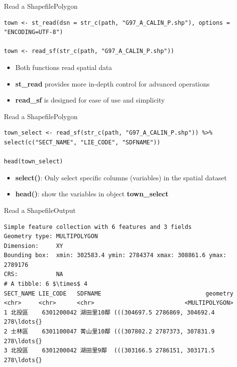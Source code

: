 \documentclass[hyperref={pdfpagelabels=false}]{beamer}
\begin{document}
\begin{frame}[fragile]{Read a Shapefile}{Polygon}

\begin{lstlisting}
town <- st_read(dsn = str_c(path, "G97_A_CALIN_P.shp"), options = "ENCODING=UTF-8")

town <- read_sf(str_c(path, "G97_A_CALIN_P.shp"))
\end{lstlisting}
\begin{itemize}
\item Both functions read spatial data
\vspace{0.2cm}
\item \textbf{st\_read} provides more in-depth control for advanced operations
\vspace{0.2cm}
\item \textbf{read\_sf} is designed for ease of use and simplicity


\end{itemize}

\end{frame}



\begin{frame}[fragile]{Read a Shapefile}{Polygon}
	
\begin{lstlisting}
town_select <- read_sf(str_c(path, "G97_A_CALIN_P.shp")) %>%
select(c("SECT_NAME", "LIE_CODE", "SDFNAME"))

head(town_select) 
\end{lstlisting}
	\begin{itemize}
		\item \textbf{select()}: Only select specific columns (variables) in the spatial dataset
		\vspace{0.2cm}
		\item \textbf{head()}: show the variables in object \textbf{town\_select}
		
	\end{itemize}
	
\end{frame}



\begin{frame}[fragile]{Read a Shapefile}{Output}

\tiny

\begin{lstlisting}
Simple feature collection with 6 features and 3 fields
Geometry type: MULTIPOLYGON
Dimension:     XY
Bounding box:  xmin: 302583.4 ymin: 2784374 xmax: 308861.6 ymax: 2789176
CRS:           NA
# A tibble: 6 $\times$ 4
SECT_NAME LIE_CODE   SDFNAME                              geometry
<chr>     <chr>      <chr>                          <MULTIPOLYGON>
1 北投區    6301200042 湖田里10鄰 (((304697.5 2786869, 304692.4 278\ldots{}
2 士林區    6301100047 菁山里10鄰 (((307802.2 2787373, 307831.9 278\ldots{}
3 北投區    6301200042 湖田里9鄰  (((303166.5 2786151, 303171.5 278\ldots{}
\end{lstlisting}

\end{frame}
\end{document}
